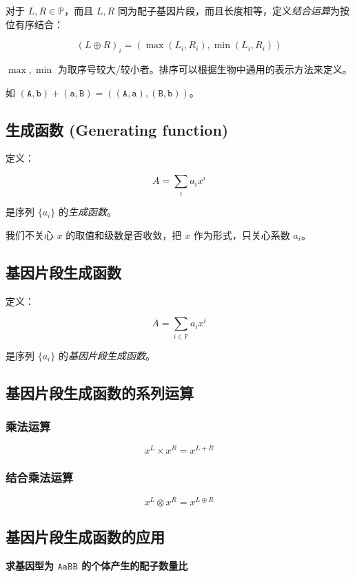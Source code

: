 \documentclass{article}
\begin{document}
对于 $L,R \in \mathbb{P}$，而且 $L,R$ 同为配子基因片段，而且长度相等，定义\textsl{结合运算}为按位有序结合：

$$(L \oplus R)_i=(\max(L_i,R_i),\min(L_i,R_i))$$

$\max,\min$ 为取序号较大/较小者。排序可以根据生物中通用的表示方法来定义。

如 $(\texttt{A},\texttt{b}) + (\texttt{a},\texttt{B})=((\texttt{A},\texttt{a}),(\texttt{B},\texttt{b}))$。

\subsection{生成函数 (Generating function)} 

定义：

$$A=\sum_{i} a_i x^{i}$$

是序列 $\{a_i\}$ 的\textsl{生成函数}。

我们不关心 $x$ 的取值和级数是否收敛，把 $x$ 作为形式，只关心系数 $a_i$。

\subsection{基因片段生成函数}

定义：

$$A=\sum_{i \in \mathbb{P}} a_i x^{i}$$

是序列 $\{a_i\}$ 的\textsl{基因片段生成函数}。

\subsection{基因片段生成函数的系列运算}

\subsubsection*{乘法运算}

$$x^L \times x^R=x^{L+R}$$

\subsubsection*{结合乘法运算}

$$x^L \otimes x^R=x^{L \oplus R}$$

\subsection{基因片段生成函数的应用}

\textbf{求基因型为 $\texttt{AaBB}$ 的个体产生的配子数量比}
\end{document}
